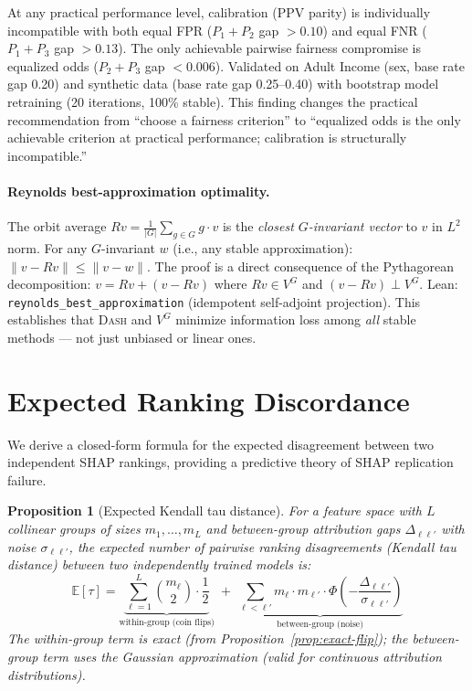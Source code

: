 \documentclass{article}
\newcommand{\DASH}{\textsc{Dash}}
\newtheorem{proposition}[theorem]{Proposition}
\begin{document}
\noindent At any practical performance level, calibration (PPV parity) is individually incompatible with both equal FPR ($P_1{+}P_2$ gap $> 0.10$) and equal FNR ($P_1{+}P_3$ gap $> 0.13$). The only achievable pairwise fairness compromise is equalized odds ($P_2{+}P_3$ gap $< 0.006$). Validated on Adult Income (sex, base rate gap 0.20) and synthetic data (base rate gap 0.25--0.40) with bootstrap model retraining (20 iterations, 100\% stable). This finding changes the practical recommendation from ``choose a fairness criterion'' to ``equalized odds is the only achievable criterion at practical performance; calibration is structurally incompatible.''

\paragraph{Reynolds best-approximation optimality.}
The orbit average $Rv = \frac{1}{|G|}\sum_{g \in G} g \cdot v$ is the \emph{closest $G$-invariant vector} to $v$ in $L^2$ norm. For any $G$-invariant $w$ (i.e., any stable approximation): $\|v - Rv\| \leq \|v - w\|$. The proof is a direct consequence of the Pythagorean decomposition: $v = Rv + (v - Rv)$ where $Rv \in V^G$ and $(v - Rv) \perp V^G$. Lean: \texttt{reynolds\_best\_approximation} (idempotent self-adjoint projection). This establishes that \DASH{} and $V^G$ minimize information loss among \emph{all} stable methods --- not just unbiased or linear ones.

\section{Expected Ranking Discordance}

We derive a closed-form formula for the expected disagreement
between two independent SHAP rankings, providing a predictive
theory of SHAP replication failure.

\begin{proposition}[Expected Kendall tau distance]
\label{prop:kendall-tau}
For a feature space with $L$ collinear groups of sizes
$m_1, \ldots, m_L$ and between-group attribution gaps
$\Delta_{\ell\ell'}$ with noise $\sigma_{\ell\ell'}$, the expected
number of pairwise ranking disagreements (Kendall tau distance)
between two independently trained models is:
\begin{equation}
\label{eq:kendall-prediction}
    \mathbb{E}[\tau] =
    \underbrace{\sum_{\ell=1}^{L} \binom{m_\ell}{2} \cdot
    \frac{1}{2}}_{\text{within-group (coin flips)}}
    \;+\;
    \underbrace{\sum_{\ell < \ell'} m_\ell \cdot m_{\ell'} \cdot
    \Phi\!\left(-\frac{\Delta_{\ell\ell'}}
    {\sigma_{\ell\ell'}}\right)}_{\text{between-group (noise)}}
\end{equation}
The within-group term is exact (from
Proposition~\ref{prop:exact-flip}); the between-group term uses the
Gaussian approximation (valid for continuous attribution distributions).
\end{proposition}
\end{document}
